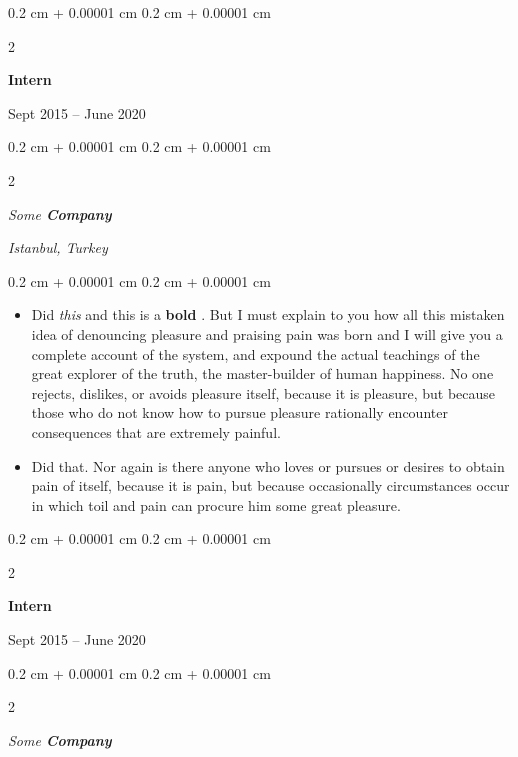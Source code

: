 \documentclass[10pt, letterpaper]{article}
\newenvironment{highlights}{
    \begin{itemize}[
        topsep=0.10 cm,
        parsep=0.10 cm,
        partopsep=0pt,
        itemsep=0pt,
        leftmargin=0.4 cm + 10pt
    ]
}{
    \end{itemize}
} %
\newenvironment{onecolentry}{
    \begin{adjustwidth}{
        0.2 cm + 0.00001 cm
    }{
        0.2 cm + 0.00001 cm
    }
}{
    \end{adjustwidth}
} %
\newenvironment{twocolentry}[2][]{
    \onecolentry
    \def\secondColumn{#2}
    \setcolumnwidth{\fill, 4.5 cm}
    \begin{paracol}{2}
}{
    \switchcolumn \raggedleft \secondColumn
    \end{paracol}
    \endonecolentry
} %
\let\hrefWithoutArrow\href
\renewcommand{\href}[2]{\hrefWithoutArrow{#1}{\ifthenelse{\equal{#2}{}}{ }{#2 }\raisebox{.15ex}{\footnotesize \faExternalLink*}}}
\begin{document}
                \begin{twocolentry}{
                    Sept 2015 – June 2020
                }
                \textbf{Intern}
                \end{twocolentry}
            \begin{twocolentry}{
        \textit{Istanbul, Turkey}    }
            \textit{Some \textbf{Company}}
            \end{twocolentry}

        \vspace{0.10 cm}
        \begin{onecolentry}
            \begin{highlights}
                \item Did \textit{this} and this is a \textbf{bold} \href{https://example.com}{link}. But I must explain to you how all this mistaken idea of denouncing pleasure and praising pain was born and I will give you a complete account of the system, and expound the actual teachings of the great explorer of the truth, the master-builder of human happiness. No one rejects, dislikes, or avoids pleasure itself, because it is pleasure, but because those who do not know how to pursue pleasure rationally encounter consequences that are extremely painful.
                \item Did that. Nor again is there anyone who loves or pursues or desires to obtain pain of itself, because it is pain, but because occasionally circumstances occur in which toil and pain can procure him some great pleasure.
            \end{highlights}
        \end{onecolentry}


        \vspace{0.2 cm}

                \begin{twocolentry}{
                    Sept 2015 – June 2020
                }
                \textbf{Intern}
                \end{twocolentry}
            \begin{twocolentry}{
            }
            \textit{Some \textbf{Company}}
            \end{twocolentry}
\end{document}

